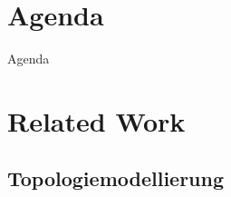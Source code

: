\documentclass[ngerman,compress,hyperref={bookmarks}]{beamer}
\begin{document}

\section*{Agenda}
\begin{frame}{Agenda} \setcounter{tocdepth}{1} \tableofcontents[part=1] \setcounter{tocdepth}{3} \end{frame}

\section{Related Work}

\subsection{Topologiemodellierung}
\end{document}
